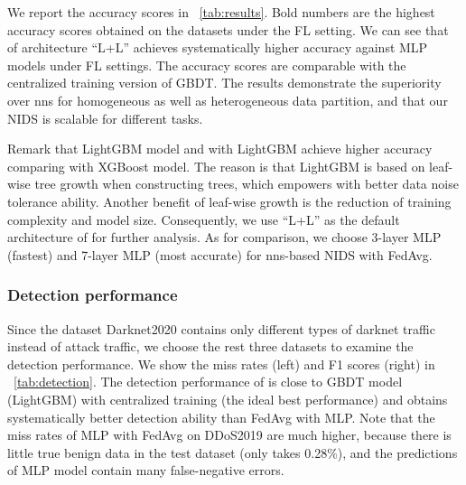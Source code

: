 We report the accuracy scores in \tablename~\ref{tab:results}.
Bold numbers are the highest accuracy scores obtained on the datasets under the FL setting.
We can see that \Fname of architecture ``L+L'' achieves systematically higher accuracy against MLP models under FL settings.
The accuracy scores are comparable with the centralized training version of GBDT.
The results demonstrate the superiority over \acp{nn} for homogeneous as well as heterogeneous data partition, and that our NIDS is scalable for different tasks.

Remark that LightGBM model and \Fname with LightGBM achieve higher accuracy comparing with XGBoost model. The reason is that LightGBM is based on leaf-wise tree growth when constructing trees, which empowers \Fname with better data noise tolerance ability.
Another benefit of leaf-wise growth is the reduction of training complexity and model size.
Consequently, we use ``L+L'' as the default architecture of \Fname for further analysis. As for comparison, we choose 3-layer MLP  (fastest) and 7-layer MLP (most accurate) for \acp{nn}-based NIDS with FedAvg.

\subsubsection{Detection performance}

Since the dataset Darknet2020 contains only different types of darknet traffic instead of attack traffic, we choose the rest three datasets to examine the detection performance. We show the miss rates (left) and F1 scores (right) in \tablename~\ref{tab:detection}. The detection performance of \Fname is close to GBDT model (LightGBM) with centralized training (the ideal best performance) and obtains systematically better detection ability than FedAvg with MLP. Note that the miss rates of MLP with FedAvg on DDoS2019 are much higher, because there is little true benign data in the test dataset (only takes 0.28\%), and the predictions of MLP model contain many false-negative errors.


\begin{table}[!h]
\centering
\small
\caption{The miss rates and F1 scores for FedAvg with MLP,  LightGBM with centralized training and \Fname (L+L).}
\label{tab:detection}
\end{table}

